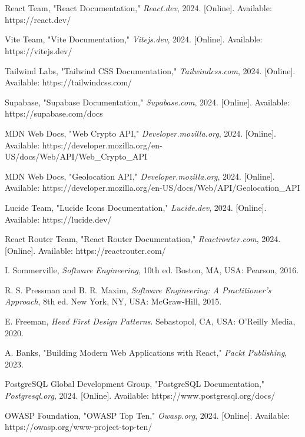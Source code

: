 \documentclass[12pt,a4paper]{report}
\makeatletter
\renewenvironment{thebibliography}[1]
  {\section*{}\@mkboth{}{}%
   \list{\@biblabel{\@arabic\c@enumiv}}%
        {\settowidth\labelwidth{\@biblabel{#1}}%
         \leftmargin\labelwidth
         \advance\leftmargin\labelsep
         \itemsep=0.6\baselineskip
         \usecounter{enumiv}%
         \let\p@enumiv\@empty
         \renewcommand\theenumiv{\@arabic\c@enumiv}}%
   \sloppy}
  {\endlist}
\makeatother
\begin{document}
\begin{thebibliography}{10}

React Team, "React Documentation," \textit{React.dev}, 2024. [Online]. Available: https://react.dev/

Vite Team, "Vite Documentation," \textit{Vitejs.dev}, 2024. [Online]. Available: https://vitejs.dev/

Tailwind Labs, "Tailwind CSS Documentation," \textit{Tailwindcss.com}, 2024. [Online]. Available: https://tailwindcss.com/

Supabase, "Supabase Documentation," \textit{Supabase.com}, 2024. [Online]. Available: https://supabase.com/docs

MDN Web Docs, "Web Crypto API," \textit{Developer.mozilla.org}, 2024. [Online]. Available: https://developer.mozilla.org/en-US/docs/Web/API/Web_Crypto_API

MDN Web Docs, "Geolocation API," \textit{Developer.mozilla.org}, 2024. [Online]. Available: https://developer.mozilla.org/en-US/docs/Web/API/Geolocation_API

Lucide Team, "Lucide Icons Documentation," \textit{Lucide.dev}, 2024. [Online]. Available: https://lucide.dev/

React Router Team, "React Router Documentation," \textit{Reactrouter.com}, 2024. [Online]. Available: https://reactrouter.com/

I. Sommerville, \textit{Software Engineering}, 10th ed. 
Boston, MA, USA: Pearson, 2016.

R. S. Pressman and B. R. Maxim, \textit{Software Engineering: A Practitioner's Approach}, 8th ed. 
New York, NY, USA: McGraw-Hill, 2015.

E. Freeman, \textit{Head First Design Patterns}. 
Sebastopol, CA, USA: O'Reilly Media, 2020.

A. Banks, "Building Modern Web Applications with React," \textit{Packt Publishing}, 2023.

PostgreSQL Global Development Group, "PostgreSQL Documentation," \textit{Postgresql.org}, 2024. [Online]. Available: https://www.postgresql.org/docs/

OWASP Foundation, "OWASP Top Ten," \textit{Owasp.org}, 2024. [Online]. Available: https://owasp.org/www-project-top-ten/

\end{thebibliography}
\end{document}
